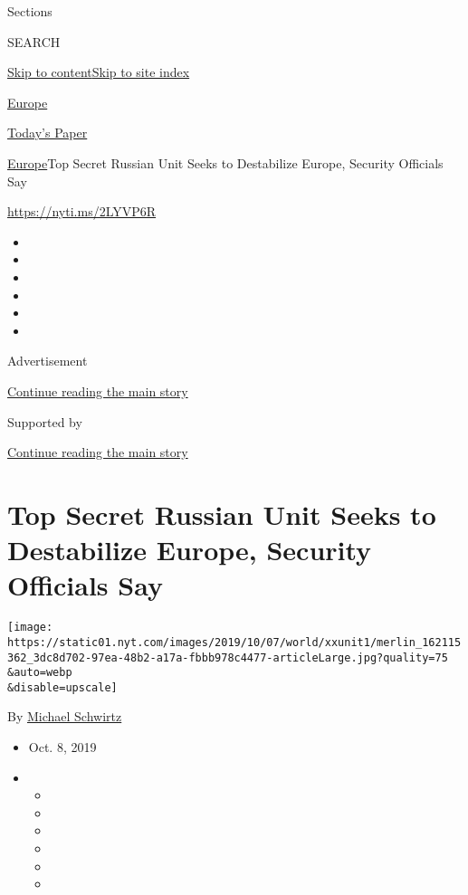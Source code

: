 Sections

SEARCH

\protect\hyperlink{site-content}{Skip to
content}\protect\hyperlink{site-index}{Skip to site index}

\href{https://www.nytimes.com/section/world/europe}{Europe}

\href{https://myaccount.nytimes.com/auth/login?response_type=cookie\&client_id=vi}{}

\href{https://www.nytimes.com/section/todayspaper}{Today's Paper}

\href{/section/world/europe}{Europe}\textbar{}Top Secret Russian Unit
Seeks to Destabilize Europe, Security Officials Say

\url{https://nyti.ms/2LYVP6R}

\begin{itemize}
\item
\item
\item
\item
\item
\item
\end{itemize}

Advertisement

\protect\hyperlink{after-top}{Continue reading the main story}

Supported by

\protect\hyperlink{after-sponsor}{Continue reading the main story}

\hypertarget{top-secret-russian-unit-seeks-to-destabilize-europe-security-officials-say}{%
\section{Top Secret Russian Unit Seeks to Destabilize Europe, Security
Officials
Say}\label{top-secret-russian-unit-seeks-to-destabilize-europe-security-officials-say}}

\texttt{[image: https://static01.nyt.com/images/2019/10/07/world/xxunit1/merlin\_162115362\_3dc8d702-97ea-48b2-a17a-fbbb978c4477-articleLarge.jpg?quality=75\\\&auto=webp\\\&disable=upscale]}

By \href{https://www.nytimes.com/by/michael-schwirtz}{Michael Schwirtz}

\begin{itemize}
\item
  Oct. 8, 2019
\item
  \begin{itemize}
  \item
  \item
  \item
  \item
  \item
  \item
  \end{itemize}
\end{itemize}

